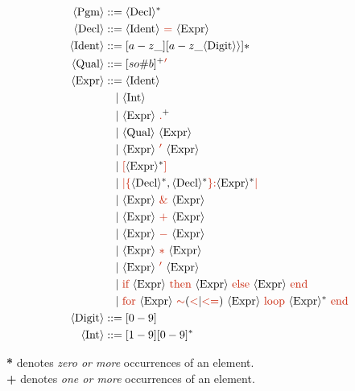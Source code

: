 \documentclass[letterpaper,12pt]{article}
\begin{document}
\newcommand{\nt}[1]{\textcolor{syntax_color}{#1}}
\newcommand{\ntext}[1]{\textcolor{syntax_color}{\text{#1}}}
\newcommand{\term}[1]{\langle \text{#1} \rangle}
\begin{align*}
    \term{Pgm} &::= \langle \text{Decl} \rangle^* \\
    \langle \text{Decl} \rangle &::= \term{Ident} \ \ntext{=} \ \langle \text{Expr} \rangle \\
    \term{Ident} &::= [a-z\_][a-z\_\term{Digit} \rangle]* \\
    \term{Qual} &::= [so\#b]^+\textcolor{syntax_color}{'} \\
    \term{Expr} &::= \langle \text{Ident} \rangle \\
    &\quad | \ \langle \text{Int} \rangle \\
    &\quad | \ \term{Expr} \ \textcolor{syntax_color}{.}^+ \\
    &\quad | \ \term{Qual} \ \term{Expr} \\
    &\quad | \ \term{Expr} \ \nt{'} \ \term{Expr} \\
    &\quad | \ \nt{[} \term{Expr}^* \nt{]} \\
    &\quad | \ \nt{|} \nt{\lbrace} \term{Decl}^*, \term{Decl}^* \nt{\rbrace} \nt{:} \term{Expr}^* \nt{|} \\
    &\quad | \ \term{Expr} \ \nt{\&} \ \term{Expr} \\
    &\quad | \ \term{Expr} \ \nt{+} \ \term{Expr} \\
    &\quad | \ \term{Expr} \ \nt{-} \ \term{Expr} \\
    &\quad | \ \term{Expr} \ \nt{*} \ \term{Expr} \\
    &\quad | \ \term{Expr} \ \nt{'} \ \term{Expr} \\
    &\quad | \ \ntext{\text{if}}\  \term{Expr} \ \ntext{then}\ \term{Expr} \ \ntext{else}\ \term{Expr} \ \ntext{end} \\
    &\quad | \ \textcolor{syntax_color}{\text{for}}\  \term{Expr} \ \textcolor{syntax_color}{\sim}{(\nt{<}|\nt{<=})}\ \term{Expr} \ \textcolor{syntax_color}{\text{loop}}\ \term{Expr}^* \ \ntext{end} \\
   \term{Digit} &::= {[0-9]} \\
    \term{Int} &::= {[1-9][0-9]^*}
\end{align*}

\vspace{2mm}
\noindent\textbf{*} denotes \emph{zero or more} occurrences of an element.\\
\textbf{+} denotes \emph{one or more} occurrences of an element.
\end{document}
